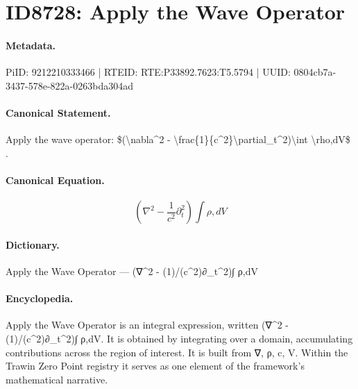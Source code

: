 \section*{ID8728: Apply the Wave Operator}
\paragraph{Metadata.}
PiID: 9212210333466 | RTEID: RTE:P33892.7623:T5.5794 | UUID: 0804cb7a-3437-578e-822a-0263bda304ad

\paragraph{Canonical Statement.}
Apply the wave operator: \$(\textbackslash{}nabla\textasciicircum{}2 - \textbackslash{}frac\{1\}\{c\textasciicircum{}2\}\textbackslash{}partial\_t\textasciicircum{}2)\textbackslash{}int \textbackslash{}rho,dV\$ .

\paragraph{Canonical Equation.}
\[
(\nabla^2 - \frac{1}{c^2}\partial_t^2)\int \rho,dV
\]

\paragraph{Dictionary.}
Apply the Wave Operator — (∇\textasciicircum{}2 - (1)/(c\textasciicircum{}2)∂\_t\textasciicircum{}2)∫ ρ,dV

\paragraph{Encyclopedia.}
Apply the Wave Operator is an integral expression, written (∇\textasciicircum{}2 - (1)/(c\textasciicircum{}2)∂\_t\textasciicircum{}2)∫ ρ,dV. It is obtained by integrating over a domain, accumulating contributions across the region of interest. It is built from ∇, ρ, c, V. Within the Trawin Zero Point registry it serves as one element of the framework's mathematical narrative.
